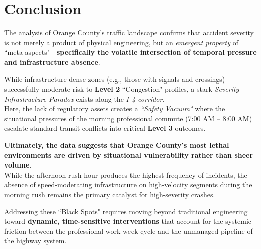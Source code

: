 \documentclass[conference]{IEEEtran}
\begin{document}
\newpage
\section{\textbf{Conclusion}}

The analysis of Orange County’s traffic landscape confirms that accident severity is not merely a product of physical engineering, but an \textit{emergent property} of ``meta-aspects"—\textbf{specifically the volatile intersection of temporal pressure and infrastructure absence}. 

While infrastructure-dense zones (e.g., those with signals and crossings) successfully moderate risk to \textbf{Level 2} ``Congestion" profiles, a stark \textit{Severity-Infrastructure Paradox} exists along the \textit{I-4 corridor}.\\
\indent Here, the lack of regulatory assets creates a \textit{``Safety Vacuum"} where the situational pressures of the morning professional commute (7:00 AM – 8:00 AM) escalate standard transit conflicts into critical \textbf{Level 3} outcomes.

\textbf{Ultimately, the data suggests that Orange County’s most lethal environments are driven by situational vulnerability rather than sheer volume}.\\
\indent While the afternoon rush hour produces the highest frequency of incidents, the absence of speed-moderating infrastructure on high-velocity segments during the morning rush remains the primary catalyst for high-severity crashes. 

Addressing these ``Black Spots" requires moving beyond traditional engineering toward \textbf{dynamic, time-sensitive interventions} that account for the systemic friction between the professional work-week cycle and the unmanaged pipeline of the highway system.
\end{document}
